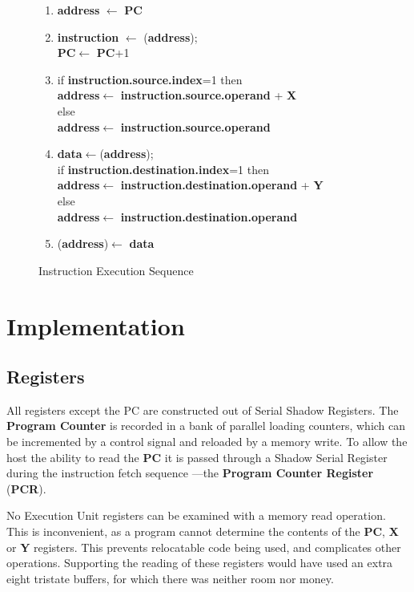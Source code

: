 \begin{figure}



\begin{enumerate}
\item {\bf address} $\leftarrow$ {\bf PC}
\item {\bf instruction} $\leftarrow$ ({\bf address});\\
{\bf PC}$\leftarrow$ {\bf PC}+1
\item if {\bf instruction.source.index}=1 then \\
{\bf address}$\leftarrow$ {\bf instruction.source.operand} + {\bf X}\\
else\\
{\bf address}$\leftarrow$ {\bf instruction.source.operand}
\item {\bf data}$\leftarrow$({\bf address});\\
if {\bf instruction.destination.index}=1 then \\
{\bf address}$\leftarrow$ {\bf instruction.destination.operand} + {\bf Y}\\
else\\
{\bf address}$\leftarrow$ {\bf instruction.destination.operand}
\item ({\bf address})$\leftarrow$ {\bf data}
\end{enumerate}
\caption{Instruction Execution Sequence}
\label{figure:rtl}
\end{figure}

\section{Implementation}

\subsection{Registers}

All registers except the PC are  constructed out of Serial Shadow 
Registers. 
The {\bf Program Counter} is  recorded in a bank of parallel loading counters, which 
 can 
be incremented by a control signal and  
reloaded by a memory write. 
To allow the host the ability to read the {\bf PC} it is passed through a 
Shadow Serial Register during the instruction fetch sequence ---the
 {\bf Program Counter Register}
({\bf PCR}). 

No Execution Unit registers can be examined with a memory read operation. This is inconvenient, as a program cannot determine the contents of the {\bf PC}, {\bf X} or {\bf Y} registers.
This prevents relocatable code being used, and complicates other operations. Supporting the reading of  these registers would have used an extra eight tristate buffers, for which there was neither room nor money.

